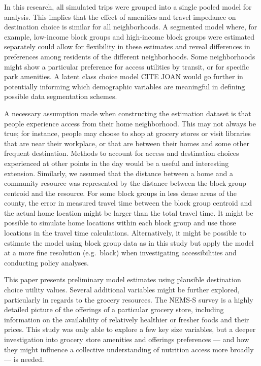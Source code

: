 \documentclass[3p, authoryear]{elsarticle} %
\begin{document}
In this research, all simulated trips were grouped into a single pooled model
for analysis. This implies that the effect of amenities and travel impedance on
destination choice is similar for all neighborhoods. A segmented model
where, for example, low-income block groups and high-income block groups were
estimated separately could allow for flexibility in these estimates and reveal
differences in preferences among residents of the different neighborhoods. Some
neighborhoods might show a particular preference for access utilities by
transit, or for specific park amenities. A latent class choice model CITE JOAN
would go further in potentially informing which demographic variables are
meaningful in defining possible data segmentation schemes.

A necessary assumption made when constructing the estimation dataset is that
people experience access from their home neighborhood. This may not always be true;
for instance, people may choose to shop at grocery stores or visit libraries that
are near their workplace, or that are between their homes and some other
frequent destination. Methods to account for access and destination choices
experienced at other points in the day would be a useful and interesting extension.
Similarly, we assumed that the distance between a home and a community resource
was represented by the distance between the block group centroid and the resource.
For some block groups in less dense areas of the county, the error in measured
travel time between the block group centroid and the actual home location might be
larger than the total travel time. It might be possible to simulate home locations
within each block group and use those locations in the travel time calculations.
Alternatively, it might be possible to estimate the model using block group data
as in this study but apply the model at a more fine resolution (e.g.~block) when
investigating accessibilities and conducting policy analyses.

This paper presents preliminary model estimates using plausible destination
choice utility values. Several additional variables might be further explored,
particularly in regards to the grocery resources. The NEMS-S survey is a highly
detailed picture of the offerings of a particular grocery store, including
information on the availability of relatively healthier or fresher foods and
their prices. This study was only able to explore a few key size variables, but
a deeper investigation into grocery store amenities and offerings
preferences --- and how they might influence a collective understanding of
nutrition access more broadly --- is needed.
\end{document}
